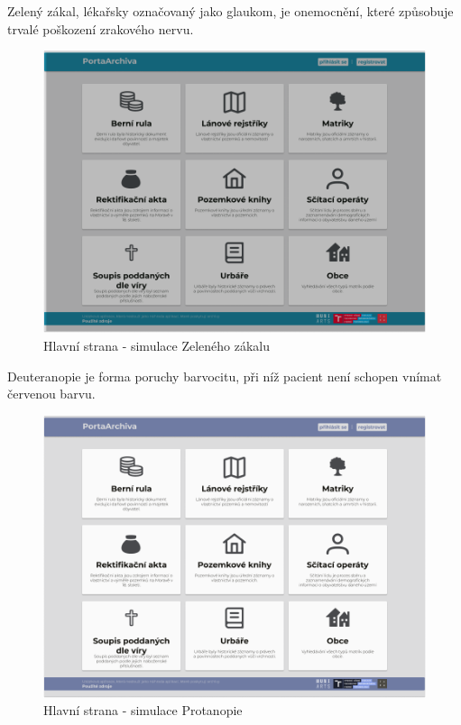 \newpage
\noindent
Zelený zákal, lékařsky označovaný jako glaukom, je onemocnění, které způsobuje trvalé poškození zrakového nervu.
\begin{figure}[htbp]
\centering
    \includegraphics[scale=.35]{obrazky-figures/testing/figma-eye-defects/Main - Loss of Contrast.png}
    \caption{Hlavní strana - simulace Zeleného zákalu}
\end{figure}

\noindent
Deuteranopie je forma poruchy barvocitu, při níž pacient není schopen vnímat červenou barvu.
\begin{figure}[htbp]
\centering
    \includegraphics[scale=.35]{obrazky-figures/testing/figma-eye-defects/Main - Protanopia.png}
    \caption{Hlavní strana - simulace Protanopie}
\end{figure}

